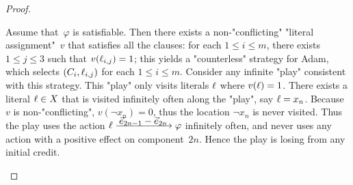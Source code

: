 \begin{proof}
\begin{scope}
    Assume that~$\varphi$ is satisfiable.  Then there exists a
    non-"conflicting" "literal assignment"~$v$ that satisfies all the
    clauses: for each $1\leq i\leq m$, there exists $1\leq j\leq 3$
    such that $v(\ell_{i,j})=1$; this yields a "counterless" strategy
    for Adam, which selects $(C_i,\ell_{i,j})$ for each
    $1\leq i\leq m$.  Consider any infinite "play" consistent with
    this strategy.  This "play" only visits literals $\ell$ where
    $v(\ell)=1$.  There exists a literal $\ell\in X$ that is visited
    infinitely often along the "play", say $\ell=x_n$.  Because~$v$ is
    non-"conflicting", $v(\neg x_n)=0$, thus the location $\neg x_n$
    is never visited.  Thus the play uses the action
    $\litt\step{\vec e_{2n-1}-\vec e_{2n}}\varphi$ infinitely often,
    and never uses any action with a positive effect on
    component~$2n$.  Hence the play is losing from any initial credit.


\end{scope}
\end{proof}
